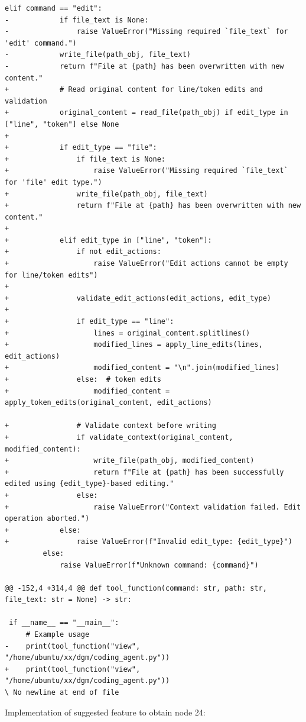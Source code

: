 \documentclass{article} %
\begin{document}
\begin{lstlisting}[style=diffstyle]
         elif command == "edit":
-            if file_text is None:
-                raise ValueError("Missing required `file_text` for 'edit' command.")
-            write_file(path_obj, file_text)
-            return f"File at {path} has been overwritten with new content."
+            # Read original content for line/token edits and validation
+            original_content = read_file(path_obj) if edit_type in ["line", "token"] else None
+
+            if edit_type == "file":
+                if file_text is None:
+                    raise ValueError("Missing required `file_text` for 'file' edit type.")
+                write_file(path_obj, file_text)
+                return f"File at {path} has been overwritten with new content."
+
+            elif edit_type in ["line", "token"]:
+                if not edit_actions:
+                    raise ValueError("Edit actions cannot be empty for line/token edits")
+
+                validate_edit_actions(edit_actions, edit_type)
+
+                if edit_type == "line":
+                    lines = original_content.splitlines()
+                    modified_lines = apply_line_edits(lines, edit_actions)
+                    modified_content = "\n".join(modified_lines)
+                else:  # token edits
+                    modified_content = apply_token_edits(original_content, edit_actions)
 
+                # Validate context before writing
+                if validate_context(original_content, modified_content):
+                    write_file(path_obj, modified_content)
+                    return f"File at {path} has been successfully edited using {edit_type}-based editing."
+                else:
+                    raise ValueError("Context validation failed. Edit operation aborted.")
+            else:
+                raise ValueError(f"Invalid edit_type: {edit_type}")
         else:
             raise ValueError(f"Unknown command: {command}")
 
@@ -152,4 +314,4 @@ def tool_function(command: str, path: str, file_text: str = None) -> str:
 
 if __name__ == "__main__":
     # Example usage
-    print(tool_function("view", "/home/ubuntu/xx/dgm/coding_agent.py"))
+    print(tool_function("view", "/home/ubuntu/xx/dgm/coding_agent.py"))
\ No newline at end of file
\end{lstlisting}


Implementation of suggested feature to obtain node 24:
\end{document}
